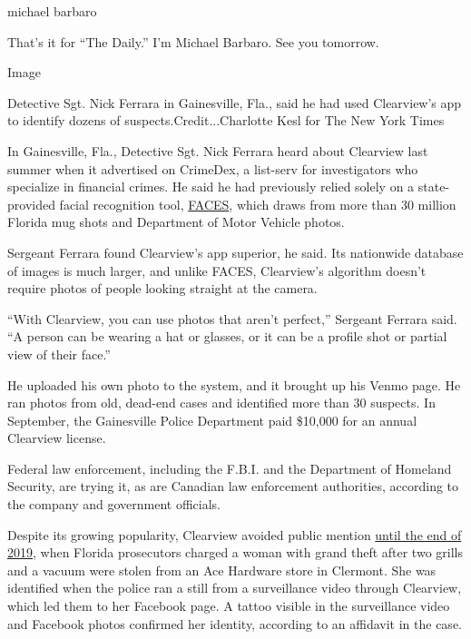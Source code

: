 michael barbaro

That's it for ``The Daily.'' I'm Michael Barbaro. See you tomorrow.

Image

Detective Sgt. Nick Ferrara in Gainesville, Fla., said he had used
Clearview's app to identify dozens of suspects.Credit...Charlotte Kesl
for The New York Times

In Gainesville, Fla., Detective Sgt. Nick Ferrara heard about Clearview
last summer when it advertised on CrimeDex, a list-serv for
investigators who specialize in financial crimes. He said he had
previously relied solely on a state-provided facial recognition tool,
\href{https://www.nytimes3xbfgragh.onion/2020/01/12/technology/facial-recognition-police.html}{FACES},
which draws from more than 30 million Florida mug shots and Department
of Motor Vehicle photos.

Sergeant Ferrara found Clearview's app superior, he said. Its nationwide
database of images is much larger, and unlike FACES, Clearview's
algorithm doesn't require photos of people looking straight at the
camera.

``With Clearview, you can use photos that aren't perfect,'' Sergeant
Ferrara said. ``A person can be wearing a hat or glasses, or it can be a
profile shot or partial view of their face.''

He uploaded his own photo to the system, and it brought up his Venmo
page. He ran photos from old, dead-end cases and identified more than 30
suspects. In September, the Gainesville Police Department paid \$10,000
for an annual Clearview license.

Federal law enforcement, including the F.B.I. and the Department of
Homeland Security, are trying it, as are Canadian law enforcement
authorities, according to the company and government officials.

Despite its growing popularity, Clearview avoided public mention
\href{https://www.wftv.com/news/local/florida-law-enforcement-agencies-use-facial-recognition-identify-alleged-thief/SGHPUGB5W5CX3FYVSLU7P6EV7I/}{until
the end of 2019}, when Florida prosecutors charged a woman with grand
theft after two grills and a vacuum were stolen from an Ace Hardware
store in Clermont. She was identified when the police ran a still from a
surveillance video through Clearview, which led them to her Facebook
page. A tattoo visible in the surveillance video and Facebook photos
confirmed her identity, according to an affidavit in the case.

